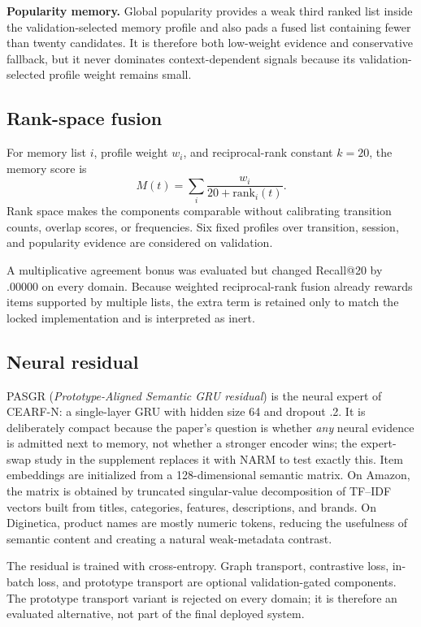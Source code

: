 \documentclass[runningheads]{llncs}
\newcommand{\method}{CEARF-N}
\begin{document}
\textbf{Popularity memory.} Global popularity provides a weak third ranked list
inside the validation-selected memory profile and also pads a fused list
containing fewer than twenty candidates. It is therefore both low-weight
evidence and conservative fallback, but it never dominates context-dependent
signals because its validation-selected profile weight remains small.

\subsection{Rank-space fusion}
For memory list $i$, profile weight $w_i$, and reciprocal-rank constant
$k=20$, the memory score is
\begin{equation}
M(t)=\sum_i \frac{w_i}{20+\mathrm{rank}_i(t)}.
\end{equation}
Rank space makes the components comparable without calibrating transition
counts, overlap scores, or frequencies. Six fixed profiles over transition,
session, and popularity evidence are considered on validation.

A multiplicative agreement bonus was evaluated but changed Recall@20 by
.00000 on every domain. Because weighted reciprocal-rank fusion already
rewards items supported by multiple lists, the extra term is retained only to
match the locked implementation and is interpreted as inert.

\subsection{Neural residual}
PASGR (\emph{Prototype-Aligned Semantic GRU residual}) is the neural expert
of \method{}: a single-layer GRU with hidden size 64 and dropout .2. It is
deliberately compact because the paper's question is whether \emph{any}
neural evidence is admitted next to memory, not whether a stronger encoder
wins; the expert-swap study in the supplement replaces it with NARM to test
exactly this. Item
embeddings are initialized from a 128-dimensional semantic matrix. On Amazon,
the matrix is obtained by truncated singular-value decomposition of TF--IDF
vectors built from titles, categories, features, descriptions, and brands. On
Diginetica, product names are mostly numeric tokens, reducing the usefulness of
semantic content and creating a natural weak-metadata contrast.

The residual is trained with cross-entropy. Graph transport, contrastive loss,
in-batch loss, and prototype transport are optional validation-gated
components. The prototype transport variant is rejected on every domain; it is
therefore an evaluated alternative, not part of the final deployed system.
\end{document}
